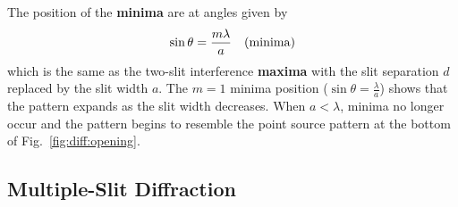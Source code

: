 The position of the {\bf minima} are at angles given by
\begin{eqnarray*}
\sin \theta = \frac{m \lambda}{a}~~~{\rm (minima)}
\end{eqnarray*}
which is the same as the two-slit interference {\bf maxima} with the slit 
separation
$d$ replaced by the slit width $a$.
The $m=1$ minima position ($\sin \theta = \frac{\lambda}{a}$) shows that the 
pattern expands as the slit width decreases.  When $a < \lambda$, minima no
longer occur and the pattern begins to resemble the point source pattern at the
bottom of Fig.~\ref{fig:diff:opening}.
\suppressfloats

\subsection{Multiple-Slit Diffraction}
\label{sec:diff:multislit}

